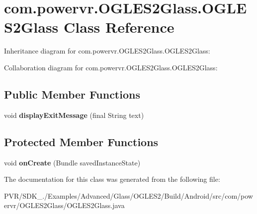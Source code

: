 \hypertarget{classcom_1_1powervr_1_1_o_g_l_e_s2_glass_1_1_o_g_l_e_s2_glass}{\section{com.\+powervr.\+O\+G\+L\+E\+S2\+Glass.\+O\+G\+L\+E\+S2\+Glass Class Reference}
\label{classcom_1_1powervr_1_1_o_g_l_e_s2_glass_1_1_o_g_l_e_s2_glass}
}


Inheritance diagram for com.\+powervr.\+O\+G\+L\+E\+S2\+Glass.\+O\+G\+L\+E\+S2\+Glass\+:


Collaboration diagram for com.\+powervr.\+O\+G\+L\+E\+S2\+Glass.\+O\+G\+L\+E\+S2\+Glass\+:
\subsection*{Public Member Functions}
\begin{DoxyCompactItemize}
\item 
\hypertarget{classcom_1_1powervr_1_1_o_g_l_e_s2_glass_1_1_o_g_l_e_s2_glass_a38163b0c4f339a5e24df78105346c3e2}{void {\bfseries display\+Exit\+Message} (final String text)}\label{classcom_1_1powervr_1_1_o_g_l_e_s2_glass_1_1_o_g_l_e_s2_glass_a38163b0c4f339a5e24df78105346c3e2}

\end{DoxyCompactItemize}
\subsection*{Protected Member Functions}
\begin{DoxyCompactItemize}
\item 
\hypertarget{classcom_1_1powervr_1_1_o_g_l_e_s2_glass_1_1_o_g_l_e_s2_glass_a8a0f0ed72e304dc29770ab204d207215}{void {\bfseries on\+Create} (Bundle saved\+Instance\+State)}\label{classcom_1_1powervr_1_1_o_g_l_e_s2_glass_1_1_o_g_l_e_s2_glass_a8a0f0ed72e304dc29770ab204d207215}

\end{DoxyCompactItemize}


The documentation for this class was generated from the following file\+:\begin{DoxyCompactItemize}
\item 
P\+V\+R/\+S\+D\+K\+\_./\+Examples/\+Advanced/\+Glass/\+O\+G\+L\+E\+S2/\+Build/\+Android/src/com/powervr/\+O\+G\+L\+E\+S2\+Glass/O\+G\+L\+E\+S2\+Glass.\+java\end{DoxyCompactItemize}
